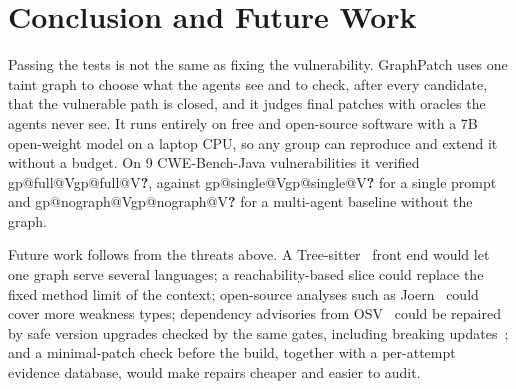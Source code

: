 \documentclass[conference]{IEEEtran}
\makeatletter
\newcommand{\res}[1]{\ifcsname gp@#1\endcsname\csname gp@#1\endcsname\else\textbf{?}\fi}
\makeatother
\begin{document}
\section{Conclusion and Future Work}
Passing the tests is not the same as fixing the vulnerability. GraphPatch uses one taint
graph to choose what the agents see and to check, after every candidate, that the
vulnerable path is closed, and it judges final patches with oracles the agents never
see. It runs entirely on free and open-source software with a 7B open-weight model on a
laptop CPU, so any group can reproduce and extend it without a budget. On 9 CWE-Bench-Java
vulnerabilities it verified \res{full@V}, against \res{single@V} for a single prompt and
\res{nograph@V} for a multi-agent baseline without the graph.

Future work follows from the threats above. A Tree-sitter~\cite{treesitter} front end
would let one graph serve several languages; a reachability-based slice could replace
the fixed method limit of the context; open-source analyses such as Joern~\cite{joern}
could cover more weakness types; dependency advisories from OSV~\cite{osv} could be
repaired by safe version upgrades checked by the same gates, including breaking
updates~\cite{reyes2024bump}; and a minimal-patch check before the build, together with
a per-attempt evidence database, would make repairs cheaper and easier to audit.
\end{document}
